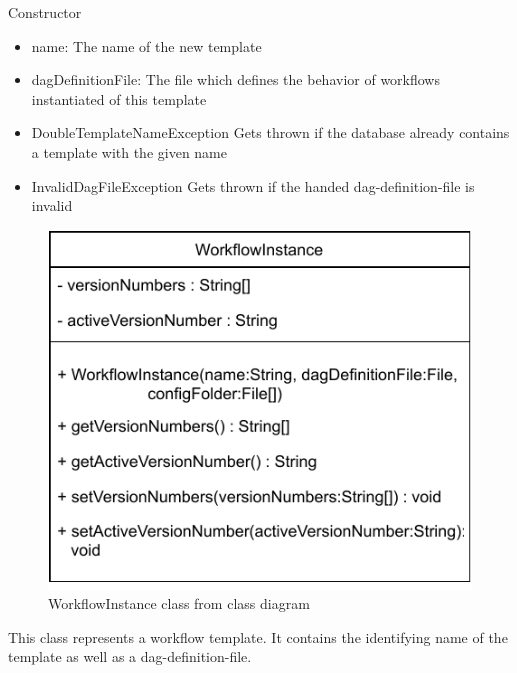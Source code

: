 \begin{methodenv}{Constructor}


\begin{itemize}
	\item{name:}
	The name of the new template
	\item{dagDefinitionFile:}
	The file which defines the behavior of workflows instantiated of this template
\end{itemize}

\begin{itemize}
	\item{DoubleTemplateNameException}
	Gets thrown if the database already contains a template with the given name
	\item{InvalidDagFileException}
	Gets thrown if the handed dag-definition-file is invalid
\end{itemize}
\end{methodenv}



\begin{figure}[h]
\centerline{\includegraphics[scale=1]{res/Klassen/WorkflowInstance.pdf}}
\caption{WorkflowInstance class from class diagram}
\end{figure}

This class represents a workflow template. It contains the identifying name of the template as well as a dag-definition-file.

